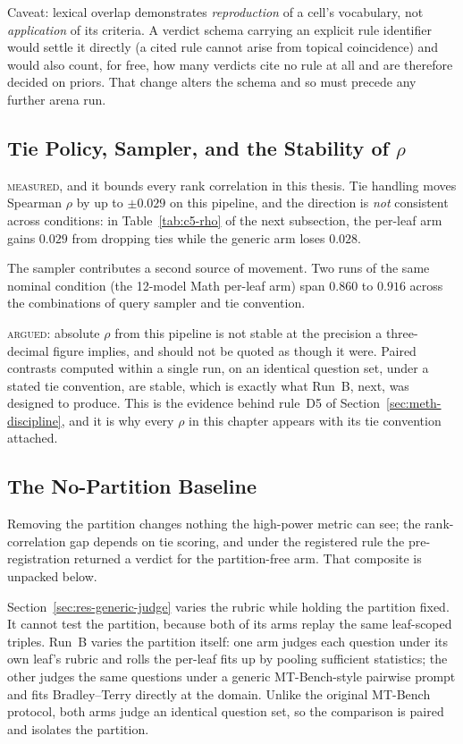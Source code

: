 Caveat: lexical overlap demonstrates \emph{reproduction} of a cell's
vocabulary, not \emph{application} of its criteria. A verdict schema
carrying an explicit rule identifier would settle it directly (a
cited rule cannot arise from topical coincidence) and would also
count, for free, how many verdicts cite no rule at all and are
therefore decided on priors. That change alters the schema and so must
precede any further arena run.

\subsection{Tie Policy, Sampler, and the Stability of \texorpdfstring{$\rho$}{rho}}\label{sec:res-tie-policy}

\textsc{measured}, and it bounds every rank correlation in this thesis.
Tie handling moves Spearman $\rho$ by up to $\pm 0.029$ on this
pipeline, and the direction is \emph{not} consistent across conditions:
in Table~\ref{tab:c5-rho} of the next subsection, the per-leaf arm
gains $0.029$ from dropping ties while the generic arm loses $0.028$.

The sampler contributes a second source of movement. Two runs of the
same nominal condition (the 12-model Math per-leaf arm) span
$0.860$ to $0.916$ across the combinations of query sampler and tie
convention.

\textsc{argued}: absolute $\rho$ from this pipeline is not stable at
the precision a three-decimal figure implies, and should not be quoted
as though it were. Paired contrasts computed within a single run, on an
identical question set, under a stated tie convention, are stable,
which is exactly what Run~B, next, was designed to produce. This is the
evidence behind rule~D5 of Section~\ref{sec:meth-discipline}, and it is
why every $\rho$ in this chapter appears with its tie convention
attached.

\subsection{The No-Partition Baseline}\label{sec:res-c5}

Removing the partition changes nothing the high-power metric can see;
the rank-correlation gap depends on tie scoring, and under the
registered rule the pre-registration returned a verdict for the
partition-free arm. That composite is unpacked below.

Section~\ref{sec:res-generic-judge} varies the rubric while holding the
partition fixed. It cannot test the partition, because both of its arms
replay the same leaf-scoped triples. Run~B varies the partition itself:
one arm judges each question under its own leaf's rubric and rolls the
per-leaf fits up by pooling sufficient statistics; the other judges the
same questions under a generic MT-Bench-style pairwise prompt and fits
Bradley--Terry directly at the domain. Unlike the original MT-Bench
protocol, both arms judge an identical question set, so the comparison
is paired and isolates the partition.

